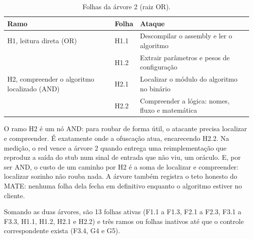 \begin{table}[htbp]
\centering
\caption{Folhas da árvore 2 (raiz OR).}
\label{qd:arvore2}
\small
\begin{tabular}{L{4.4cm}L{1.2cm}L{8.8cm}}
\toprule
Ramo & Folha & Ataque \\
\midrule
H1, leitura direta (OR) & H1.1 & Descompilar o assembly e ler o algoritmo \\
 & H1.2 & Extrair parâmetros e pesos de configuração \\
\midrule
H2, compreender o algoritmo localizado (AND) & H2.1 & Localizar o módulo do algoritmo no binário \\
 & H2.2 & Compreender a lógica: nomes, fluxo e matemática \\
\bottomrule
\end{tabular}
\end{table}

O ramo H2 é um nó AND: para roubar de forma útil, o atacante precisa localizar e compreender. É exatamente onde a ofuscação atua, encarecendo H2.2. Na medição, o red vence a árvore 2 quando entrega uma reimplementação que reproduz a saída do stub num sinal de entrada que não viu, um oráculo. E, por ser AND, o custo de um caminho por H2 é a soma de localizar e compreender: localizar sozinho não rouba nada. A árvore também registra o teto honesto do MATE: nenhuma folha dela fecha em definitivo enquanto o algoritmo estiver no cliente.

Somando as duas árvores, são 13 folhas ativas (F1.1 a F1.3, F2.1 a F2.3, F3.1 a F3.3, H1.1, H1.2, H2.1 e H2.2) e três ramos ou folhas inativos até que o controle correspondente exista (F3.4, G4 e G5).
